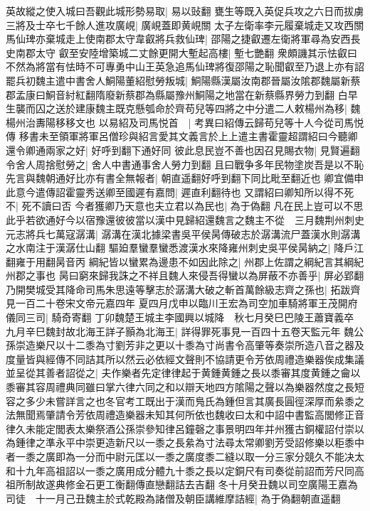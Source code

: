 英故縱之使入城曰吾觀此城形勢易取|{
	易以䜴翻}
甕生等既入英促兵攻之六日而拔虜三將及士卒七千餘人進攻廣峴|{
	廣峴蓋即黄峴關}
太子左衛率李元履棄城走又攻西關馬仙琕亦棄城走上使南郡太守韋叡將兵救仙琕|{
	邵陽之捷叡遷左衛將軍尋為安西長史南郡太守}
叡至安陸增築城二丈餘更開大塹起高樓|{
	塹七艷翻}
衆頗譏其示怯叡曰不然為將當有怯時不可專勇中山王英急追馬仙琕將復邵陽之恥聞叡至乃退上亦有詔罷兵初魏主遣中書舍人鮦陽董紹慰勞叛城|{
	鮦陽縣漢屬汝南郡晉屬汝隂郡魏屬新蔡郡孟康曰鮦音紂紅翻隋廢新蔡郡為縣屬豫州鮦陽之地當在新蔡縣界勞力到翻}
白早生襲而囚之送於建康魏主既克懸瓠命於齊苟兒等四將之中分遣二人敕楊州為移|{
	魏楊州治夀陽移移文也}
以易紹及司馬悦首　|{
	考異曰紹傳云歸苟兒等十人今從司馬悦傳}
移書未至領軍將軍呂僧珍與紹言愛其文義言於上上遣主書霍靈超謂紹曰今聽卿還令卿通兩家之好|{
	好呼到翻下通好同}
彼此息民豈不善也因召見賜衣物|{
	見賢遍翻}
令舍人周捨慰勞之|{
	舍人中書通事舍人勞力到翻}
且曰戰争多年民物塗炭吾是以不恥先言與魏朝通好比亦有書全無報者|{
	朝直遥翻好呼到翻下同比毗至翻近也}
卿宜備申此意今遣傳詔霍靈秀送卿至國遲有嘉問|{
	遲直利翻待也}
又謂紹曰卿知所以得不死不|{
	死不讀曰否}
今者獲卿乃天意也夫立君以為民也|{
	為于偽翻}
凡在民上豈可以不思此乎若欲通好今以宿豫還彼彼當以漢中見歸紹還魏言之魏主不從　三月魏荆州刺史元志將兵七萬寇潺溝|{
	潺溝在漢北據梁書吳平侯昺傳破志於潺溝流尸蓋漢水則潺溝之水南注于漢潺仕山翻}
驅廹羣蠻羣蠻悉渡漢水來降雍州刺史吳平侯昺納之|{
	降戶江翻雍于用翻昺音丙}
綱紀皆以蠻累為邊患不如因此除之|{
	州郡上佐謂之綱紀言其綱紀州郡之事也}
昺曰窮來歸我誅之不祥且魏人來侵吾得蠻以為屏蔽不亦善乎|{
	屏必郢翻}
乃開樊城受其降命司馬朱思遠等擊志於潺溝大破之斬首萬餘級志齊之孫也|{
	拓跋齊見一百二十卷宋文帝元嘉四年}
夏四月戊申以臨川王宏為司空加車騎將軍王茂開府儀同三司|{
	騎奇寄翻}
丁卯魏楚王城主李國興以城降　秋七月癸巳巴陵王蕭寶義卒　九月辛巳魏封故北海王詳子顥為北海王|{
	詳得罪死事見一百四十五卷天監元年}
魏公孫崇造樂尺以十二黍為寸劉芳非之更以十黍為寸尚書令高肇等奏崇所造八音之器及度量皆與經傳不同詰其所以然云必依經文聲則不協請更令芳依周禮造樂器俟成集議並呈從其善者詔從之|{
	夫作樂者先定律律起于黄鍾黄鍾之長以黍審其度黄鍾之龠以黍審其容周禮典同雖曰掌六律六同之和以辯天地四方隂陽之聲以為樂器然度之長短容之多少未嘗詳言之也冬官考工既出于漢而鳬氏為鍾但言其廣長圓徑深厚而絫黍之法無聞焉肇請令芳依周禮造樂器未知其何所依也魏收曰太和中詔中書監高閭修正音律久未能定閭表太樂祭酒公孫崇參知律呂鐘磬之事景明四年并州獲古銅權詔付崇以為鍾律之準永平中崇更造新尺以一黍之長絫為寸法尋太常卿劉芳受詔修樂以秬黍中者一黍之廣即為一分而中尉元匡以一黍之廣度黍二縫以取一分三家分競久不能决太和十九年高祖詔以一黍之廣用成分體九十黍之長以定銅尺有司奏從前詔而芳尺同高祖所制故遂典修金石更工衡翻傳直戀翻詰去吉翻}
冬十月癸丑魏以司空廣陽王嘉為司徒　十一月己丑魏主於式乾殿為諸僧及朝臣講維摩詰經|{
	為于偽翻朝直遥翻}
